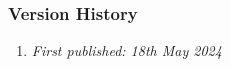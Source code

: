 \subsubsection{Version History}
\begin{enumerate}
	\item \emph{First published: 18th May 2024}
\end{enumerate}


